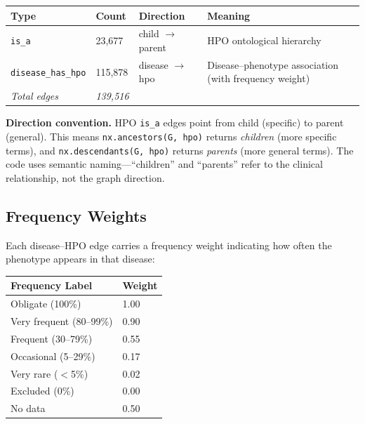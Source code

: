 \documentclass[11pt,a4paper]{article}
\begin{document}
\begin{table}[H]
\centering
\begin{tabular}{@{}llll@{}}
\toprule
\textbf{Type} & \textbf{Count} & \textbf{Direction} & \textbf{Meaning} \\
\midrule
\texttt{is\_a} & 23,677 & child $\rightarrow$ parent & HPO ontological hierarchy \\
\texttt{disease\_has\_hpo} & 115,878 & disease $\rightarrow$ hpo & Disease–phenotype association (with frequency weight) \\
\midrule
\textit{Total edges} & \textit{139,516} & & \\
\bottomrule
\end{tabular}
\end{table}

\begin{callout}
\textbf{Direction convention.} HPO \texttt{is\_a} edges point from child (specific) to parent (general). This means \texttt{nx.ancestors(G, hpo)} returns \textit{children} (more specific terms), and \texttt{nx.descendants(G, hpo)} returns \textit{parents} (more general terms). The code uses semantic naming—``children'' and ``parents'' refer to the clinical relationship, not the graph direction.
\end{callout}

\subsection{Frequency Weights}

Each disease–HPO edge carries a frequency weight indicating how often the phenotype appears in that disease:

\begin{table}[H]
\centering
\begin{tabular}{@{}ll@{}}
\toprule
\textbf{Frequency Label} & \textbf{Weight} \\
\midrule
Obligate (100\%)     & 1.00 \\
Very frequent (80–99\%) & 0.90 \\
Frequent (30–79\%)    & 0.55 \\
Occasional (5–29\%)   & 0.17 \\
Very rare ($<$5\%)     & 0.02 \\
Excluded (0\%)        & 0.00 \\
No data               & 0.50 \\
\bottomrule
\end{tabular}
\end{table}
\end{document}
